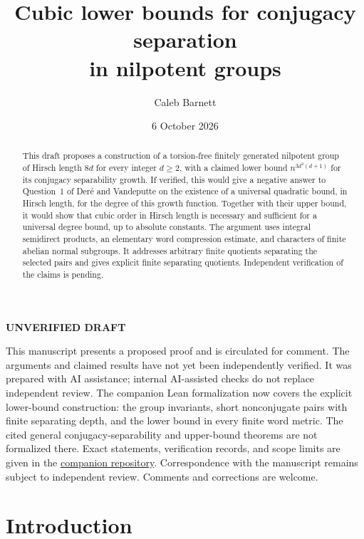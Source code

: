 \documentclass[11pt]{article}
\title{Cubic lower bounds for conjugacy separation\\in nilpotent groups}
\author{Caleb Barnett}
\date{6 October 2026}
\numberwithin{equation}{section}
\theoremstyle{remark}
\begin{document}
\maketitle

\begin{center}
\textbf{UNVERIFIED DRAFT}\\[6pt]
\begin{minipage}{0.92\textwidth}
\small
This manuscript presents a proposed proof and is circulated for comment.
The arguments and claimed results have not yet been independently
verified. It was prepared with AI assistance; internal AI-assisted
checks do not replace independent review. The companion Lean formalization
now covers the explicit lower-bound construction: the group invariants,
short nonconjugate pairs with finite separating depth, and the lower bound
in every finite word metric. The cited general conjugacy-separability
and upper-bound theorems are not formalized there. Exact statements,
verification records, and scope limits are given in the
\href{https://github.com/barnettcaleb1/nilpotent-conjugacy}{companion repository}.
Correspondence with the manuscript remains subject to independent review.
Comments and corrections are welcome.
\end{minipage}
\end{center}

\begin{abstract}
This draft proposes a construction of a torsion-free finitely generated
nilpotent group of Hirsch length $8d$ for every integer $d\ge2$, with
a claimed lower bound $n^{3d^2(d+1)}$ for its conjugacy separability
growth. If verified, this would give a negative answer to Question~1
of Der\'e and Vandeputte on the existence of a universal quadratic
bound, in Hirsch length, for the degree of this growth function.
Together with their upper bound, it would show that cubic order in
Hirsch length is necessary and sufficient for a universal degree
bound, up to absolute constants. The argument uses integral
semidirect products, an elementary word compression estimate, and
characters of finite abelian normal subgroups. It addresses arbitrary
finite quotients separating the selected pairs and gives explicit
finite separating quotients. Independent verification of the claims
is pending.
\end{abstract}

\section{Introduction}
\end{document}
